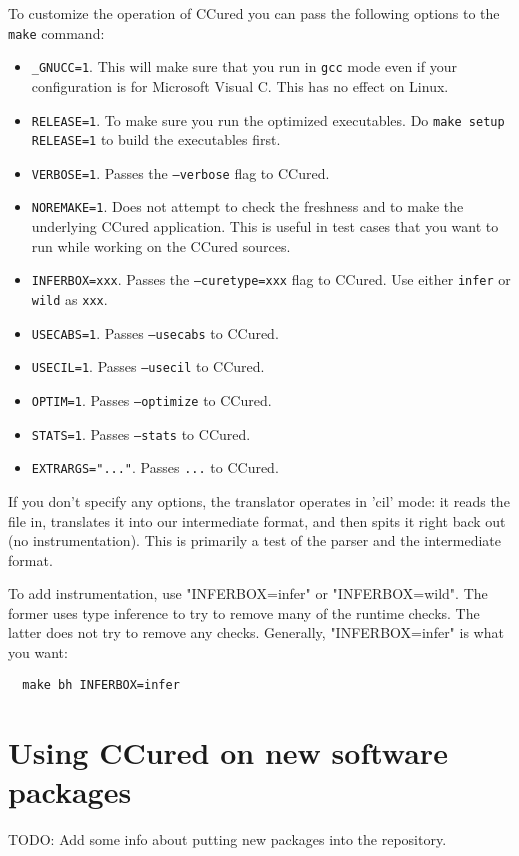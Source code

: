 \documentclass{book}
\def\t#1{{\tt #1}}
\begin{document}
 To customize the operation of CCured you can pass the following options to
the \t{make} command:
\begin{itemize}
\item \t{\_GNUCC=1}. This will make sure that you run in \t{gcc} mode even if
your configuration is for Microsoft Visual C. This has no effect on Linux.
\item \t{RELEASE=1}. To make sure you run the optimized executables. Do
\t{make setup RELEASE=1} to build the executables first.
\item \t{VERBOSE=1}. Passes the \t{--verbose} flag to CCured.
\item \t{NOREMAKE=1}. Does not attempt to check the freshness and to make the
underlying CCured application. This is useful in test cases that you want to
run while working on the CCured sources.
\item \t{INFERBOX=xxx}. Passes the \t{--curetype=xxx} flag to CCured. Use
either \t{infer} or \t{wild} as \t{xxx}.
\item \t{USECABS=1}. Passes \t{--usecabs} to CCured.
\item \t{USECIL=1}. Passes \t{--usecil} to CCured.
\item \t{OPTIM=1}. Passes \t{--optimize} to CCured.
\item \t{STATS=1}. Passes \t{--stats} to CCured.
\item \t{EXTRARGS="..."}. Passes \t{...} to CCured.
\end{itemize}

 If you don't specify any options, the translator operates in 'cil' mode:
it reads the file in, translates it into our intermediate format, and
then spits it right back out (no instrumentation).  This is primarily a
test of the parser and the intermediate format.

To add instrumentation, use "INFERBOX=infer" or "INFERBOX=wild".  The former
uses type inference to try to remove many of the runtime checks.  The
latter does not try to remove any checks.  Generally, "INFERBOX=infer" is
what you want:

\begin{verbatim}
  make bh INFERBOX=infer
\end{verbatim}


\chapter{Using CCured on new software packages}

TODO: Add some info about putting new packages into the repository.
\end{document}
